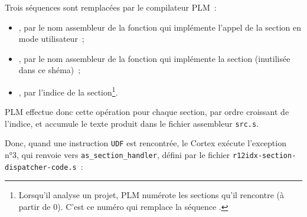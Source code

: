 Trois séquences sont remplacées par le compilateur PLM~:
\begin{itemize}
\item {}, par le nom assembleur de la fonction qui implémente l'appel de la section en mode utilisateur~;
\item {}, par le nom assembleur de la fonction qui implémente la section (inutilisée dans ce shéma)~;
\item {}, par l'indice de la section\footnote{Lorsqu'il analyse un projet, PLM numérote les sections qu'il rencontre (à partir de $0$). C'est ce numéro qui remplace la séquence .}.
\end{itemize}

PLM effectue donc cette opération pour chaque section, par ordre croissant de l'indice, et accumule le texte produit dans le fichier assembleur \texttt{src.s}.

Donc, quand une instruction \texttt{UDF} est rencontrée, le Cortex exécute l'exception n°3, qui renvoie vers \texttt{as\_section\_handler}, défini par le fichier \texttt{r12idx-section-dispatcher-code.s}~:

